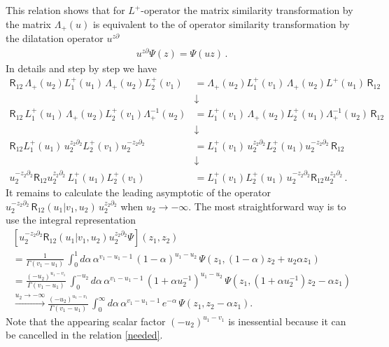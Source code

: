\documentclass[11pt]{article}
\numberwithin{equation}{section}
\theoremstyle{plain}
\theoremstyle{definition}
\newcommand{\R}{\mathsf{R}}
\begin{document}
This relation shows that for $L^{+}$-operator the 
matrix similarity transformation by the matrix $\Lambda_+(u)$ 
is equivalent to the of operator similarity transformation 
by the dilatation operator $u^{z\partial}$
\begin{align*}
	u^{z\partial} \Psi(z) = \Psi(u z)\,.
\end{align*}
In details and step by step we have  
\begin{align*}
	\R_{12}\,\Lambda_{+}(u_2)
	L_1^{+}(u_1)\,\Lambda_{+}(u_2)L_2^{+}(v_1) &= 
	\Lambda_{+}(u_2)L_1^{+}(v_1)\,\Lambda_{+}(u_2)L^{+}(u_1)\,
	\R_{12} \\ 
	&\downarrow  \\ 
	\R_{12}\,
	L_1^{+}(u_1)\,\Lambda_+(u_2) L_2^{+}(v_1)\Lambda^{-1}_+(u_2) &=
	L_1^{+}(v_1)\,
	\Lambda_+(u_2) L_2^{+}(u_1)\Lambda^{-1}_+(u_2)\,
	\R_{12} \\ 
	&\downarrow \\ 
	\R_{12}
	L_1^{+}(u_1)\, u_2^{z_2\partial_2} L_2^{+}(v_1) u_2^{-z_2\partial_2} &=
	L_1^{+}(v_1)\, u_2^{z_2\partial_2} L_2^{+}(u_1) u_2^{-z_2\partial_2}\, 
	\R_{12} \\ 
	&\downarrow \\  u_2^{-z_2\partial_2} \R_{12} u_2^{z_2\partial_2}\,
	L_1^{+}(u_1) L_2^{+}(v_1)  &=
	L_1^{+}(v_1) L_2^{+}(u_1)\, 
	u_2^{-z_2\partial_2} 
	\R_{12} u_2^{z_2\partial_2}\,.
\end{align*}
It remains to calculate the leading asymptotic of the operator 
$u_2^{-z_2\partial_2}\, 
\R_{12}(u_1|v_1,u_2)\,u_2^{z_2\partial_2}$ when $u_2 \to -\infty$.
The most straightforward way is to use the integral representation 
\begin{multline*}
	\left[u_2^{-z_2\partial_2} 
	\R_{12}(u_1|v_1,u_2)u_2^{z_2\partial_2}\Psi\right](z_1,z_2) \\[4pt] 
	=
	\frac{1}{\Gamma(v_1-u_1)}\,\int_{0}^1 d\alpha\,\alpha^{v_1-u_1-1} \,
	(1-\alpha)^{u_1-u_2}\,\Psi(z_1,(1-\alpha)z_2+u_2\alpha z_1)\\[4pt]  
	=
	\frac{(-u_2)^{u_1-v_1}}{\Gamma(v_1-u_1)}\,\int_{0}^{-u_2} d\alpha\,\alpha^{v_1-u_1-1} \,
	(1+\alpha u^{-1}_2)^{u_1-u_2}\,
	\Psi(z_1,(1+\alpha u^{-1}_2) z_2 - \alpha z_1)\\[4pt]  
	\xrightarrow{u_2\to-\infty}
	\frac{(-u_2)^{u_1-v_1}}{\Gamma(v_1-u_1)}\,
	\int_{0}^{\infty} d\alpha\,\alpha^{v_1-u_1-1} \,e^{-\alpha}
	\,\Psi(z_1,z_2 - \alpha z_1) .
\end{multline*}
Note that the appearing scalar factor $(-u_2)^{u_1-v_1}$ 
is inessential because it can be cancelled in the relation \eqref{needed}. 
\end{document}

